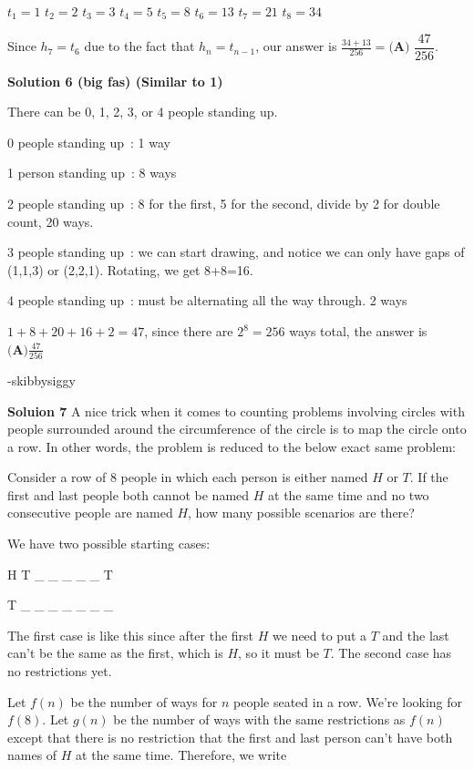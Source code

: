 \begin{enumerate}
 $t_1=1$
$t_2=2$
$t_3=3$
$t_4=5$
$t_5=8$
$t_6=13$
$t_7=21$
$t_8=34$

 Since $h_7=t_6$ due to the fact that $h_n=t_{n-1}$, our answer is $\frac{34+13}{256}=\boxed{\textbf{(A) } \dfrac{47}{256}}$.

 



\textbf{Solution 6 (big fas) (Similar to 1)}

There can be 0, 1, 2, 3, or 4 people standing up. 

 0 people standing up : 1 way

 
1 person standing up : 8 ways

 
2 people standing up : 8 for the first, 5 for the second, divide by 2 for double count, 20 ways.

 
3 people standing up : we can start drawing, and notice we can only have gaps of (1,1,3) or (2,2,1). Rotating, we get 8+8=16.

 
4 people standing up : must be alternating all the way through. 2 ways

 $1+8+20+16+2 = 47$, since there are $2^8=256$ ways total, the answer is $\boxed{\textbf{(A)}\frac{47}{256}}$

 -skibbysiggy

 \textbf{Soluion 7} A nice trick when it comes to counting problems involving circles with people surrounded around the circumference of the circle is to map the circle onto a row. In other words, the problem is reduced to the below exact same problem:

 Consider a row of $8$ people in which each person is either named $H$ or $T$. If the first and last people both cannot be named $H$ at the same time and no two consecutive people are named $H$, how many possible scenarios are there?

 We have two possible starting cases:

 H T \_ \_ \_ \_ \_ T

 T \_ \_ \_ \_ \_ \_ \_

 The first case is like this since after the first $H$ we need to put a $T$ and the last can't be the same as the first, which is $H$, so it must be $T$. The second case has no restrictions yet. 

 Let $f(n)$ be the number of ways for $n$ people seated in a row. We're looking for $f(8)$. Let $g(n)$ be the number of ways with the same restrictions as $f(n)$ except that there is no restriction that the first and last person can't have both names of $H$ at the same time. Therefore, we write


\end{enumerate}
